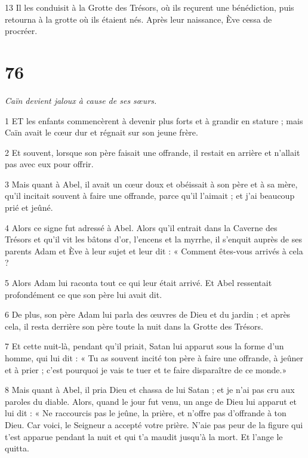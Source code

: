 \par 13 Il les conduisit à la Grotte des Trésors, où ils reçurent une bénédiction, puis retourna à la grotte où ils étaient nés. Après leur naissance, Ève cessa de procréer.

\chapter{76}

\par \textit{Caïn devient jaloux à cause de ses sœurs.}

\par 1 ET les enfants commencèrent à devenir plus forts et à grandir en stature ; mais Caïn avait le cœur dur et régnait sur son jeune frère.

\par 2 Et souvent, lorsque son père faisait une offrande, il restait en arrière et n'allait pas avec eux pour offrir.

\par 3 Mais quant à Abel, il avait un cœur doux et obéissait à son père et à sa mère, qu'il incitait souvent à faire une offrande, parce qu'il l'aimait ; et j'ai beaucoup prié et jeûné.

\par 4 Alors ce signe fut adressé à Abel. Alors qu'il entrait dans la Caverne des Trésors et qu'il vit les bâtons d'or, l'encens et la myrrhe, il s'enquit auprès de ses parents Adam et Ève à leur sujet et leur dit : « Comment êtes-vous arrivés à cela ?

\par 5 Alors Adam lui raconta tout ce qui leur était arrivé. Et Abel ressentait profondément ce que son père lui avait dit.

\par 6 De plus, son père Adam lui parla des œuvres de Dieu et du jardin ; et après cela, il resta derrière son père toute la nuit dans la Grotte des Trésors.

\par 7 Et cette nuit-là, pendant qu'il priait, Satan lui apparut sous la forme d'un homme, qui lui dit : « Tu as souvent incité ton père à faire une offrande, à jeûner et à prier ; c'est pourquoi je vais te tuer et te faire disparaître de ce monde.»

\par 8 Mais quant à Abel, il pria Dieu et chassa de lui Satan ; et je n'ai pas cru aux paroles du diable. Alors, quand le jour fut venu, un ange de Dieu lui apparut et lui dit : « Ne raccourcis pas le jeûne, la prière, et n'offre pas d'offrande à ton Dieu. Car voici, le Seigneur a accepté votre prière. N'aie pas peur de la figure qui t'est apparue pendant la nuit et qui t'a maudit jusqu'à la mort. Et l'ange le quitta.

